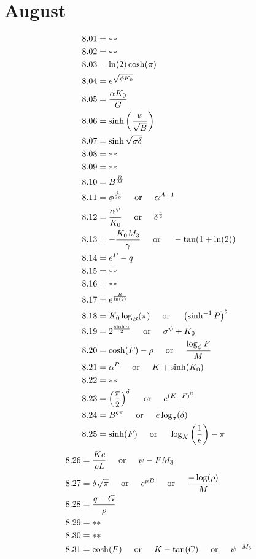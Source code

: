 \documentclass[12pt]{article}
\newcommand{\oder}{\hspace{5mm}\text{or}\hspace{5mm}}
\begin{document}
\section{August}
\begin{align*}
8.01 &= **\\
8.02 &= **\\
8.03 &= \ln(2)\cosh(\pi)\\
8.04 &= e^{\sqrt{\phi K_{0}}}\\
8.05 &= \frac{\alpha K_{0}}{G}\\
8.06 &= \sinh\left(\frac{\psi}{\sqrt{B}}\right)\\
8.07 &= \sinh\sqrt{\sigma \delta}\\
8.08 &= **\\
8.09 &= **\\
8.10 &= B^{\frac{B}{M}} \\
8.11 &= \phi^{\frac{1}{2\rho}} \oder \alpha^{A + 1}\\
8.12 &= \frac{\alpha^{\psi}}{K_{0}} \oder \delta^{\frac{e}{2}}\\
8.13 &= -\frac{K_{0} M_{3}}{\gamma} \oder -\tan(1 + \ln(2))\\
8.14 &= e^{P} - q \\
8.15 &= **\\
8.16 &= **\\
8.17 &= e^{\frac{B}{\ln(2)}} \\
8.18 &= K_{0} \log_{B}(\pi) \oder \left(\sinh^{-1}P\right)^{\delta}\\
8.19 &= 2^{\frac{\sinh \alpha}{2}} \oder \sigma^{\psi} + K_{0}\\
8.20 &= \cosh(F) - \rho \oder \frac{\log_{\phi}F}{M}\\
8.21 &= \alpha^{P} \oder K+\sinh(K_{0}) \\
8.22 &= **\\
8.23 &= \left(\frac{\pi}{2}\right)^{\delta} \oder e^{(K + F)^{\Omega}}\\
8.24 &= B^{q \pi} \oder e \log_{\sigma}(\delta)\\
8.25 &= \sinh(F) \oder \log_{K}\left(\frac{1}{e}\right) - \pi\\
\end{align*}
\begin{align*}
8.26 &= \frac{K e}{\rho L} \oder \psi - F M_{3}\\
8.27 &= \delta \sqrt{\pi} \oder e^{\mu B} \oder \frac{-\log(\rho)}{M}\\
8.28 &= \frac{q - G}{\rho}\\
8.29 &= **\\
8.30 &= **\\
8.31 &= \cosh(F) \oder K - \tan(C) \oder \psi^{-M_{3}}\\
\end{align*}
\end{document}
